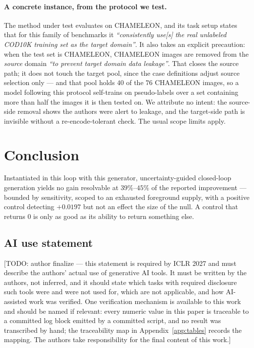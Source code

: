 \documentclass{article} %
\begin{document}
\paragraph{A concrete instance, from the protocol we test.} The method under test evaluates on
CHAMELEON, and its task setup states that for this family of benchmarks it \emph{``consistently
use[s] the real unlabeled COD10K training set as the target domain''}. It also takes an explicit
precaution: when the test set is CHAMELEON, CHAMELEON images are removed from the \emph{source} domain
\emph{``to prevent target domain data leakage''}. That closes the source path; it does not touch the
target pool, since the case definitions adjust source selection only --- and that pool holds $40$ of
the $76$ CHAMELEON images, so a model following this protocol self-trains on pseudo-labels over a set
containing more than half the images it is then tested on. We attribute no intent: the source-side
removal shows the authors were alert to leakage, and the target-side path is invisible without a
re-encode-tolerant check. The usual scope limits apply.

\section{Conclusion}
\label{sec:conclusion}

Instantiated in this loop with this generator, uncertainty-guided closed-loop generation yields no
gain resolvable at $39\%$--$45\%$ of the reported improvement --- bounded by sensitivity, scoped to an
exhausted foreground supply, with a positive control detecting $+0.0197$ but not an effect the size of
the null. A control that returns $0$ is only as good as its ability to return something else.

\subsection*{AI use statement}

[TODO: author finalize --- this statement is required by ICLR 2027 and must describe the authors'
actual use of generative AI tools. It must be written by the authors, not inferred, and it should
state which tasks with required disclosure such tools were and were not used for, which are not
applicable, and how AI-assisted work was verified. One verification mechanism is available to this
work and should be named if relevant: every numeric value in this paper is traceable to a committed
log block emitted by a committed script, and no result was transcribed by hand; the traceability map
in Appendix~\ref{app:tables} records the mapping. The authors take responsibility for the final
content of this work.]
\end{document}
